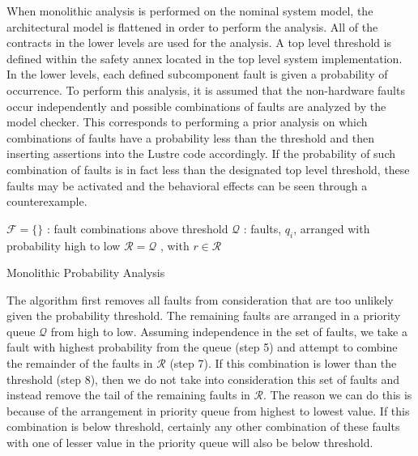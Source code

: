 When monolithic analysis is performed on the nominal system model, the architectural model is flattened in order to perform the analysis. All of the contracts in the lower levels are used for the analysis.
A top level threshold is defined within the safety annex located in the top level system implementation. In the lower levels, each defined subcomponent fault is given a probability of occurrence. To perform this analysis, it is assumed that the non-hardware faults occur independently and possible combinations of faults are analyzed by the model checker. This corresponds to performing a prior analysis on which combinations of faults have a probability less than the threshold and then inserting assertions into the Lustre code accordingly. If the probability of such combination of faults is in fact less than the designated top level threshold, these faults may be activated and the behavioral effects can be seen through a counterexample.  

\begin{algorithm}[H]
 $\mathcal{F} = \{\}$ : fault combinations above threshold \;
 $\mathcal{Q}$ : faults, $q_i$, arranged with probability high to low \;
 $\mathcal{R} = \mathcal{Q}$ , with $r \in \mathcal{R}$\;
 \caption{Monolithic Probability Analysis}
\end{algorithm}

The algorithm first removes all faults from consideration that are too unlikely given the probability threshold. The remaining faults are arranged in a priority queue $\mathcal{Q}$ from high to low. Assuming independence in the set of faults, we take a fault with highest probability from the queue (step 5) and attempt to combine the remainder of the faults in $\mathcal{R}$ (step 7). If this combination is lower than the threshold (step 8), then we do not take into consideration this set of faults and instead remove the tail of the remaining faults in $\mathcal{R}$. The reason we can do this is because of the arrangement in priority queue from highest to lowest value. If this combination is below threshold, certainly any other combination of these faults with one of lesser value in the priority queue will also be below threshold. 
 

